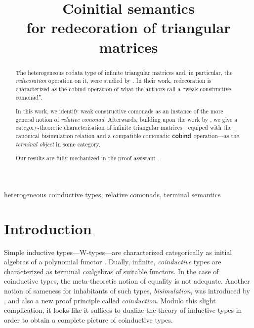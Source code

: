 \documentclass[conference,10pt]{IEEEtran}
\begin{document}
\title{Coinitial semantics \\ for redecoration of triangular matrices}
\author{
}

\maketitle

\begin{abstract}
  The heterogeneous codata type of infinite triangular matrices and, in particular, the \emph{redecoration} operation on it, 
  were studied by \citeauthor{DBLP:conf/types/MatthesP11}. In their work,  redecoration is characterized
  as the cobind operation of what the authors call a \enquote{weak constructive comonad}.
  
  In this work, we identify weak constructive comonads as an instance of the more general notion of 
  \emph{relative comonad}.
  Afterwards, building upon the work by \citeauthor{DBLP:conf/types/MatthesP11}, we give a category-theoretic
  characterisation of infinite triangular matrices---equiped with the canonical bisimulation relation and a 
  compatible comonadic $\mathsf{cobind}$ operation---as the \emph{terminal object}
  in some category.
  
  Our results are fully mechanized in the proof assistant \coq.
  \end{abstract}


\begin{IEEEkeywords}
heterogeneous coinductive types,
relative comonads,
terminal semantics
\end{IEEEkeywords}

  

\section{Introduction}

 Simple inductive types---\textsf{W}-types---are characterized categorically as initial algebras of
 a polynomial functor \parencite{DBLP:journals/apal/MoerdijkP00}.
 Dually, infinite, \emph{coinductive} types are characterized as terminal \emph{co}algebras of suitable functors.
 In the case of coinductive types, the meta-theoretic notion of equality is not adequate. Another notion of sameness for inhabitants of such types, 
 \emph{bisimulation}, was introduced by \textcite{aczel_nonwellfounded}, and also
 a new proof principle called \emph{coinduction}. 
 Modulo this slight complication, it looks like it suffices to dualize the theory of inductive types in order to obtain
 a complete picture of coinductive types.
\end{document}
